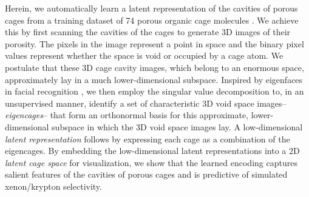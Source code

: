 \documentclass[journal=jacsat,manuscript=article,layout=traditional]{achemso}
\begin{document}
Herein, we automatically learn a latent representation of the cavities of porous cages from a training dataset of 74 porous organic cage molecules \cite{miklitz2017computational,greenaway2018high}. We achieve this by first scanning the cavities of the cages to generate 3D images of their porosity. The pixels in the image represent a point in space and the binary pixel values represent whether the space is void or occupied by a cage atom.
We postulate that these 3D cage cavity images, which belong to an enormous space, approximately lay in a much lower-dimensional subspace. Inspired by eigenfaces in facial recognition \cite{sirovich1987low,turk1991face,muller2004singular}, we then employ the singular value decomposition to, in an unsupervised manner, identify a set of characteristic 3D void space images-- \emph{eigencages}-- that form an orthonormal basis for this approximate, lower-dimensional subspace in which the 3D void space images lay. A low-dimensional \emph{latent representation} follows by expressing each cage as a combination of the eigencages. By embedding the low-dimensional latent representations into a 2D \emph{latent cage space} for visualization, we show that the learned encoding captures salient features of the cavities of porous cages and is predictive of simulated xenon/krypton selectivity.



\end{document}
